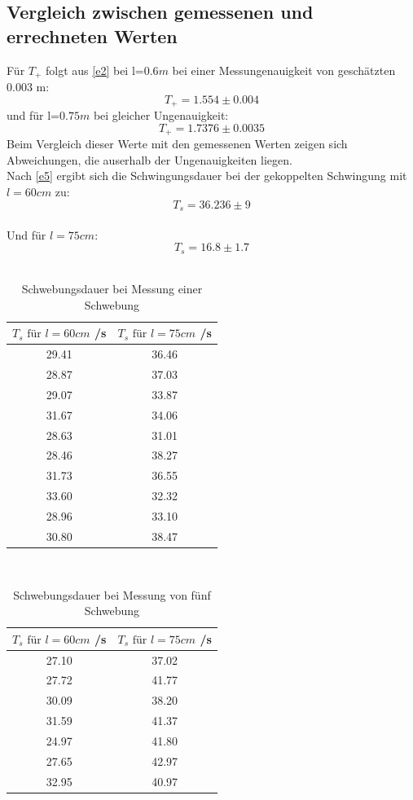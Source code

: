 \subsection{Vergleich zwischen gemessenen und errechneten Werten}
Für $T_+$ folgt aus \eqref{e2} bei l=$0.6 m$ bei einer Messungenauigkeit von geschätzten 0.003 m:
\begin{equation*}
  T_+ = 1.554 \pm 0.004
\end{equation*}
und für l=$0.75 m$ bei gleicher Ungenauigkeit:
\begin{equation*}
  T_+ = 1.7376 \pm 0.0035
\end{equation*}
Beim Vergleich dieser Werte mit den gemessenen Werten zeigen sich Abweichungen, die auserhalb der Ungenauigkeiten liegen.
\\
Nach \eqref{e5} ergibt sich die Schwingungsdauer bei der gekoppelten Schwingung mit $l = 60cm$ zu:
\begin{equation*}
  T_s = 36.236 \pm 9
\end{equation*}
\\
Und für $l = 75cm$:
\begin{equation*}
  T_s = 16.8 \pm 1.7
\end{equation*}
\\
\begin{table}[b]
  \centering
  \caption{Schwebungsdauer bei Messung einer Schwebung}
  \label{tab:data3}
  \begin{tabular}{c c}
    \toprule
    $T_{s} \text{ für } l=60cm$ /\si{\second} & $T_{s} \text{ für } l=75cm$ /\si{\second} \\
    \midrule
    29.41 & 36.46 \\
    28.87 & 37.03 \\
    29.07 & 33.87 \\
    31.67 & 34.06 \\
    28.63 & 31.01 \\
    28.46 & 38.27 \\
    31.73 & 36.55 \\
    33.60 & 32.32 \\
    28.96 & 33.10 \\
    30.80 & 38.47 \\
    \bottomrule
  \end{tabular}
\end{table}
\\
\begin{table}[b]
  \centering
  \caption{Schwebungsdauer bei Messung von fünf Schwebung}
  \label{tab:data4}
  \begin{tabular}{c c}
    \toprule
    $T_{s} \text{ für }l=60cm$ /\si{\second} & $T_{s} \text{ für } l=75cm$ /\si{\second} \\
    \midrule
    27.10 & 37.02 \\
    27.72 & 41.77 \\
    30.09 & 38.20 \\
    31.59 & 41.37 \\
    24.97 & 41.80 \\
    27.65 & 42.97 \\
    32.95 & 40.97 \\
    \bottomrule
  \end{tabular}
\end{table}
